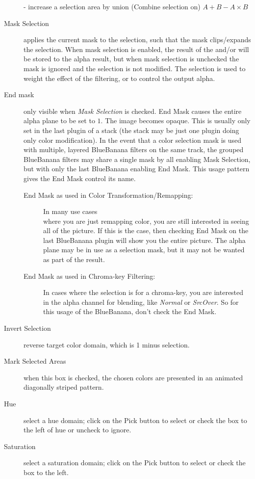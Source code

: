 \begin{description}
    - increase a selection area by union (Combine selection on) $A+B-A\times B$
    \item[Mask Selection] applies the current mask to the selection, such that the mask clips/expands the selection. When mask selection is enabled, the result of the and/or will be stored to the alpha result, but when mask selection is unchecked the mask is ignored and the selection is not modified. The selection is used to weight the effect of the filtering, or to control the output alpha.
    \item[End mask] only visible when \textit{Mask Selection} is checked. End Mask causes the entire alpha plane to
    be set to $1$. The image becomes opaque. This is usually only set in the last plugin of a stack (the stack may be just one plugin doing only color modification). In the event that a color selection mask is used with multiple, layered BlueBanana filters on the same track, the grouped BlueBanana filters may share a single mask by all enabling Mask Selection, but with only the last BlueBanana enabling End Mask. This usage pattern gives the End Mask control its name.
    \begin{description}
        \item[End Mask as used in Color Transformation/Remapping:] In many use cases \\
        where you are just remapping color, you are still interested in seeing all of the picture. If this is the case, then checking End Mask on the last BlueBanana plugin will show you the entire picture. The alpha plane may be in use as a selection mask, but it may not be wanted as part of the result.
        \item[End Mask as used in Chroma-key Filtering:] In cases where the selection is for a chroma-key, you are interested in the alpha channel for blending, like \textit{Normal} or \textit{SrcOver}. So for this usage of the BlueBanana, don't check the End Mask.
    \end{description}
    \item[Invert Selection] reverse target color domain, which is 1 minus selection.
    \item[Mark Selected Areas] when this box is checked, the chosen colors are presented in an animated 
    diagonally striped pattern.
    \item[Hue] select a hue domain; click on the Pick button to select or check the box to the left of hue or uncheck to ignore.
    \item[Saturation] select a saturation domain; click on the Pick button to select or check the box to the left.    

\end{description}
